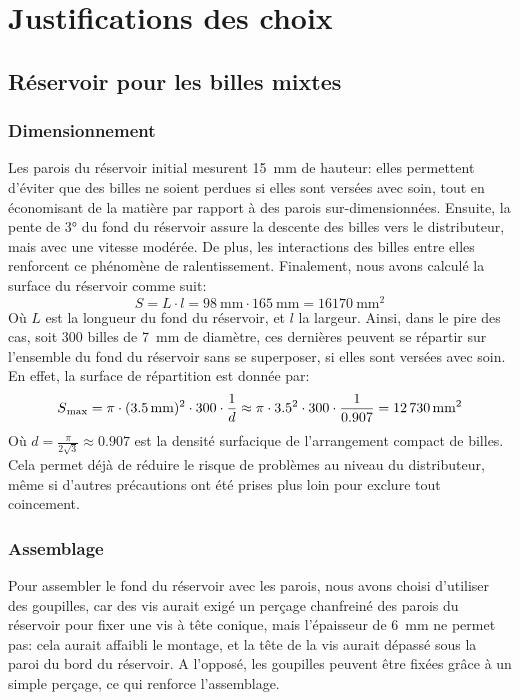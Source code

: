 \chapter{Justifications des choix}

\section{Réservoir pour les billes mixtes}

\subsection{Dimensionnement}
Les parois du réservoir initial mesurent \SI{15}{\milli\metre} de hauteur: elles permettent d'éviter que des billes ne soient perdues si elles sont versées avec soin, tout en économisant de la matière par rapport à des parois sur-dimensionnées. 
Ensuite, la pente de \ang{3} du fond du réservoir assure la descente des billes vers le distributeur, mais avec une vitesse modérée. De plus, les interactions des billes entre elles renforcent ce phénomène de ralentissement.
Finalement, nous avons calculé la surface du réservoir comme suit:
\[S = L \cdot l = \SI{98}{\milli\metre} \cdot \SI{165}{\milli\metre} = \SI{16170}{\milli\metre\squared}\]
Où $L$ est la longueur du fond du réservoir, et $l$ la largeur.
Ainsi, dans le pire des cas, soit \num{300} billes de \SI{7}{\milli\metre} de diamètre, ces dernières peuvent se répartir sur l'ensemble du fond du réservoir sans se superposer, si elles sont versées avec soin. En effet, la surface de répartition est donnée par:
\[S\textsubscript{max} = \pi \cdot (\SI{3.5}{\milli\metre})^{2} \cdot \num{300} \cdot \frac{1}{d} \approx  \pi \cdot {\num{3.5}}^{2} \cdot 300 \cdot \frac{1}{0.907} = \SI{12730}{\milli\metre\squared}\]
Où \(d = \frac{ \pi }{2\sqrt{3}} \approx \num{0.907}\) est la densité surfacique de l'arrangement compact de billes.
Cela permet déjà de réduire le risque de problèmes au niveau du distributeur, même si d'autres précautions ont été prises plus loin pour exclure tout coincement.

\subsection{Assemblage}
Pour assembler le fond du réservoir avec les parois, nous avons choisi d'utiliser des goupilles, car des vis aurait exigé un perçage chanfreiné des parois du réservoir pour fixer une vis à tête conique, mais l'épaisseur de \SI{6}{\mm} ne permet pas: cela aurait affaibli le montage, et la tête de la vis aurait dépassé sous la paroi du bord du réservoir. A l'opposé, les goupilles peuvent être fixées grâce à un simple perçage, ce qui renforce l'assemblage.

